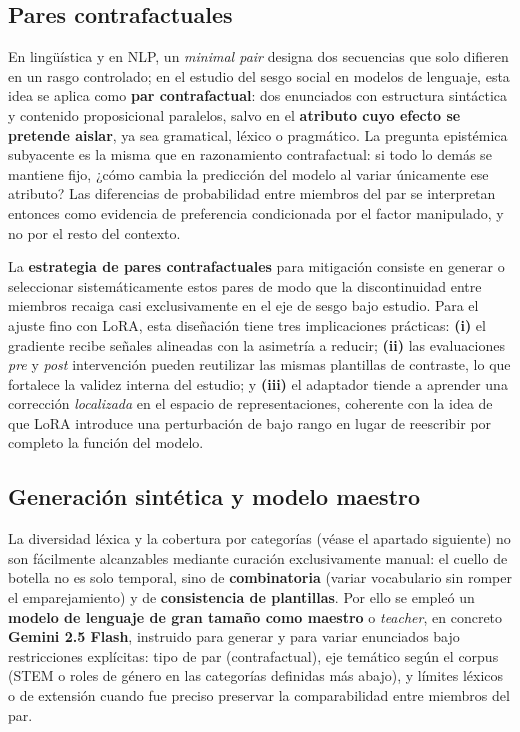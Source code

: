 \documentclass[12pt,a4paper]{report}
\begin{document}
\subsection{Pares contrafactuales}

En lingüística y en NLP, un \textit{minimal pair} designa dos secuencias que solo difieren en un rasgo controlado; en el estudio del sesgo social en modelos de lenguaje, esta idea se aplica como \textbf{par contrafactual}: dos enunciados con estructura sintáctica y contenido proposicional paralelos, salvo en el \textbf{atributo cuyo efecto se pretende aislar}, ya sea gramatical, léxico o pragmático. La pregunta epistémica subyacente es la misma que en razonamiento contrafactual: si todo lo demás se mantiene fijo, ¿cómo cambia la predicción del modelo al variar únicamente ese atributo? Las diferencias de probabilidad entre miembros del par se interpretan entonces como evidencia de preferencia condicionada por el factor manipulado, y no por el resto del contexto.

La \textbf{estrategia de pares contrafactuales} para mitigación consiste en generar o seleccionar sistemáticamente estos pares de modo que la discontinuidad entre miembros recaiga casi exclusivamente en el eje de sesgo bajo estudio. Para el ajuste fino con LoRA, esta diseñación tiene tres implicaciones prácticas: \textbf{(i)} el gradiente recibe señales alineadas con la asimetría a reducir; \textbf{(ii)} las evaluaciones \emph{pre} y \emph{post} intervención pueden reutilizar las mismas plantillas de contraste, lo que fortalece la validez interna del estudio; y \textbf{(iii)} el adaptador tiende a aprender una corrección \emph{localizada} en el espacio de representaciones, coherente con la idea de que LoRA introduce una perturbación de bajo rango \cite{hu_lora_2021} en lugar de reescribir por completo la función del modelo.

\subsection{Generación sintética y modelo maestro}

La diversidad léxica y la cobertura por categorías (véase el apartado siguiente) no son fácilmente alcanzables mediante curación exclusivamente manual: el cuello de botella no es solo temporal, sino de \textbf{combinatoria} (variar vocabulario sin romper el emparejamiento) y de \textbf{consistencia de plantillas}. Por ello se empleó un \textbf{modelo de lenguaje de gran tamaño como maestro} o \textit{teacher}, en concreto \textbf{Gemini 2.5 Flash}, instruido para generar y para variar enunciados bajo restricciones explícitas: tipo de par (contrafactual), eje temático según el corpus (STEM o roles de género en las categorías definidas más abajo), y límites léxicos o de extensión cuando fue preciso preservar la comparabilidad entre miembros del par.
\end{document}
